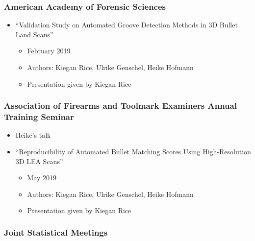 \documentclass[]{book}
\providecommand{\tightlist}{%
  \setlength{\itemsep}{0pt}\setlength{\parskip}{0pt}}
\begin{document}
\hypertarget{american-academy-of-forensic-sciences}{%
\subsubsection{American Academy of Forensic Sciences}\label{american-academy-of-forensic-sciences}}

\begin{itemize}
\tightlist
\item
  ``Validation Study on Automated Groove Detection Methods in 3D Bullet Land Scans''

  \begin{itemize}
  \tightlist
  \item
    February 2019\\
  \item
    Authors: Kiegan Rice, Ulrike Genschel, Heike Hofmann
  \item
    Presentation given by Kiegan Rice
  \end{itemize}
\end{itemize}

\hypertarget{association-of-firearms-and-toolmark-examiners-annual-training-seminar}{%
\subsubsection{Association of Firearms and Toolmark Examiners Annual Training Seminar}\label{association-of-firearms-and-toolmark-examiners-annual-training-seminar}}

\begin{itemize}
\tightlist
\item
  Heike's talk
\item
  ``Reproducibility of Automated Bullet Matching Scores Using High-Resolution 3D LEA Scans''

  \begin{itemize}
  \tightlist
  \item
    May 2019
  \item
    Authors: Kiegan Rice, Ulrike Genschel, Heike Hofmann
  \item
    Presentation given by Kiegan Rice
  \end{itemize}
\end{itemize}

\hypertarget{joint-statistical-meetings}{%
\subsubsection{Joint Statistical Meetings}\label{joint-statistical-meetings}}
\end{document}
